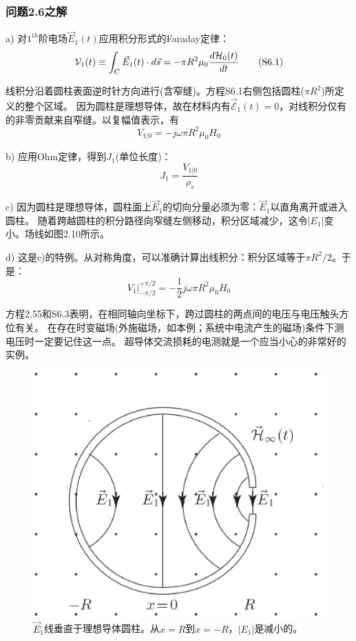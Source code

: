 \subsubsection*{问题2.6之解}
a) 对$1^{th}$阶电场$\vec{E}_1(t)$应用积分形式的Faraday定律：
\begin{equation*}
\CMcal{V}_1(t) \equiv \int_{C} \vec{E}_1 (t) \cdot d\vec{s}=-\pi R^2 \mu_0 \frac{d\CMcal{H}_0(t)}{dt} \tag{S6.1}
\end{equation*}

线积分沿着圆柱表面逆时针方向进行(含窄缝)。方程S6.1右侧包括圆柱($\pi R^2$)所定义的整个区域。
因为圆柱是理想导体，故在材料内有$\vec{\mathcal{E}}_1(t)=0$，对线积分仅有的非零贡献来自窄缝。以复幅值表示，有
\begin{equation*}
V_{1|0}=-j\omega \pi R^2 \mu_0 H_0 \tag{2.55}
\end{equation*}

b) 应用Ohm定律，得到$J_1$(单位长度)：
\begin{equation*}
J_1=\frac{V_{1|0}}{\rho_s} \tag{S6.2}
\end{equation*}

c) 因为圆柱是理想导体，圆柱面上$\vec{E}_1$的切向分量必须为零：$\vec{E}_1$以直角离开或进入圆柱。
随着跨越圆柱的积分路径向窄缝左侧移动，积分区域减少，这令$|E_1|$变小。场线如图2.10所示。

d) 这是c)的特例。从对称角度，可以准确计算出线积分：积分区域等于$\pi R^2/2$。于是：
\begin{equation*}
V_1 |_{-\pi/2}^{+\pi/2}=-\frac{1}{2}j\omega \pi R^2 \mu_0 H_0   \tag{S6.3}
\end{equation*}

方程2.55和S6.3表明，在相同轴向坐标下，跨过圆柱的两点间的电压与电压触头方位有关。
在存在时变磁场(外施磁场，如本例；系统中电流产生的磁场)条件下测电压时一定要记住这一点。
超导体交流损耗的电测就是一个应当小心的非常好的实例。

\begin{figure}[htbp]
  \centering
 \includegraphics[scale=0.4]{chpt2/figs/fig2.10.eps}
  \caption{$\vec{E}_1$线垂直于理想导体圆柱。从$x=R$到$x=-R$，$|E_1|$是减小的。}
\end{figure}


